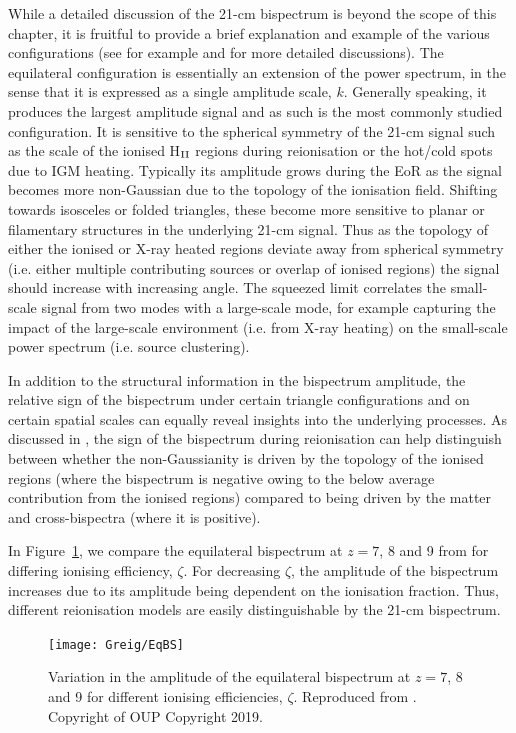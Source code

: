 While a detailed discussion of the 21-cm bispectrum is beyond the scope of this chapter, it is fruitful to provide a brief explanation and example of the various configurations (see for example \cite{Lewis:2011} and \cite{Watkinson:2019} for more detailed discussions). The equilateral configuration is essentially an extension of the power spectrum, in the sense that it is expressed as a single amplitude scale, $k$. Generally speaking, it produces the largest amplitude signal and as such is the most commonly studied configuration. It is sensitive to the spherical symmetry of the 21-cm signal such as the scale of the ionised H$_{\rm \scriptstyle II}$ regions during reionisation or the hot/cold spots due to IGM heating. Typically its amplitude grows during the EoR as the signal becomes more non-Gaussian due to the topology of the ionisation field. Shifting towards isosceles or folded triangles, these become more sensitive to planar or filamentary structures in the underlying 21-cm signal. Thus as the topology of either the ionised or X-ray heated regions deviate away from spherical symmetry (i.e. either multiple contributing sources or overlap of ionised regions) the signal should increase with increasing angle. The squeezed limit correlates the small-scale signal from two modes with a large-scale mode, for example capturing the impact of the large-scale environment (i.e. from X-ray heating) on the small-scale power spectrum (i.e. source clustering).

In addition to the structural information in the bispectrum amplitude, the relative sign of the bispectrum under certain triangle configurations and on certain spatial scales can equally reveal insights into the underlying processes. As discussed in \cite{Majumdar:2018,Hutter:2019}, the sign of the bispectrum during reionisation can help distinguish between whether the non-Gaussianity is driven by the topology of the ionised regions (where the bispectrum is negative owing to the below average contribution from the ionised regions) compared to being driven by the matter and cross-bispectra (where it is positive). 

In Figure~\ref{fig:EqBS}, we compare the equilateral bispectrum at $z=7$, 8 and 9 from \cite{Shimabukuro:2017} for differing ionising efficiency, $\zeta$. For decreasing $\zeta$, the amplitude of the bispectrum increases due to its amplitude being dependent on the ionisation fraction. Thus, different reionisation models are easily distinguishable by the 21-cm bispectrum. 

\begin{figure}[]
\begin{center}
\texttt{[image: Greig/EqBS]}
\end{center}
\caption{Variation in the amplitude of the equilateral bispectrum at $z=7$, 8 and 9 for different ionising efficiencies, $\zeta$. Reproduced from \cite{Shimabukuro:2017}. Copyright of OUP Copyright 2019.}
\label{fig:EqBS}
\end{figure}

